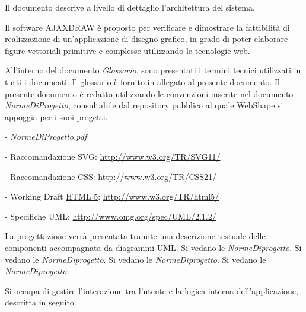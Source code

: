 \newpage
\thispagestyle{fancy}
\tableofcontents
\thispagestyle{fancy}
\newpage



Il documento descrive a livello di dettaglio l'architettura del sistema.

Il software AJAXDRAW \`e proposto per verificare e dimostrare la fattibilit\`a di realizzazione di un'applicazione di disegno grafico, in grado di poter elaborare figure vettoriali primitive e complesse utilizzando le tecnologie web.

All'interno del documento \textit{Glossario}, sono presentati i termini tecnici utilizzati in tutti i documenti. Il glossario \`e fornito in allegato al presente documento.
Il presente documento \`e redatto utilizzando le convenzioni inserite nel documento \textit{NormeDiProgetto}, consultabile dal repository pubblico al quale WebShape si appoggia per i suoi progetti.
\begin{elencopuntato}[\subsubsecindent]
\item[-] \textit{NormeDiProgetto.pdf}
\item[-] Raccomandazione SVG: \href{http://www.w3.org/TR/SVG11/}{http://www.w3.org/TR/SVG11/}
\item[-] Raccomandazione CSS: \href{http://www.w3.org/TR/CSS21/}{http://www.w3.org/TR/CSS21/}
\item[-] Working Draft \underline{HTML 5}: \href{http://www.w3.org/TR/html5/}{http://www.w3.org/TR/html5/}
\item[-] Specifiche UML: \href{http://www.omg.org/spec/UML/2.1.2/}{http://www.omg.org/spec/UML/2.1.2/}
\end{elencopuntato}

La progettazione verr\`a presentata tramite una descrizione testuale delle componenti accompagnata da diagrammi UML.
Si vedano le \textit{NormeDiprogetto}.
Si vedano le \textit{NormeDiprogetto}.
Si vedano le \textit{NormeDiprogetto}.
Si vedano le \textit{NormeDiprogetto}.

Si occupa di gestire l'interazione tra l'utente e la logica interna dell'applicazione, descritta in seguito.

